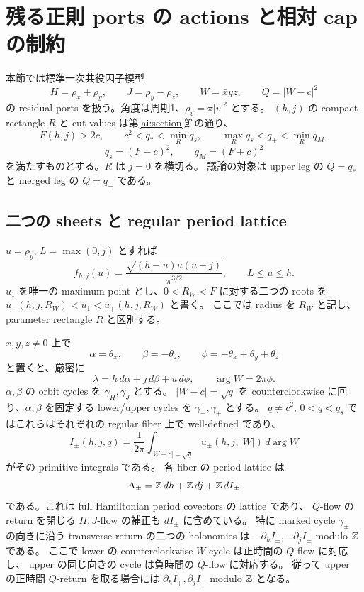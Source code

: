\section{残る正則 ports の actions と相対 cap の制約}
\label{pa:section}

本節では標準一次共役因子模型
\[
 H=\rho_x+\rho_y,\qquad J=\rho_y-\rho_z,
 \qquad W=\bar x yz,\qquad Q=|W-c|^2
\]
の residual ports を扱う。角度は周期1、$\rho_v=\pi|v|^2$ とする。
$(h,j)$ の compact rectangle $R$ と cut values は第\ref{ai:section}節の通り、
\[
 F(h,j)>2c,\qquad c^2<q_*<\min_R q_s,
 \qquad \max_R q_s<q_+<\min_R q_M,
\]
\[
 q_s=(F-c)^2,\qquad q_M=(F+c)^2
\]
を満たすものとする。$R$ は $j=0$ を横切る。
議論の対象は upper leg の $Q=q_*$ と merged leg の $Q=q_+$ である。

\subsection{二つの sheets と regular period lattice}

$u=\rho_y$, $L=\max(0,j)$ とすれば
\[
 f_{h,j}(u)=\frac{\sqrt{(h-u)u(u-j)}}{\pi^{3/2}},
 \qquad L\le u\le h.
\]
$u_1$ を唯一の maximum point とし、$0<R_W<F$ に対する二つの roots を
$u_-(h,j,R_W)<u_1<u_+(h,j,R_W)$ と書く。
ここでは radius を $R_W$ と記し、parameter rectangle $R$ と区別する。

$x,y,z\ne0$ 上で
\[
 \alpha=\theta_x,\qquad \beta=-\theta_z,\qquad
 \phi=-\theta_x+\theta_y+\theta_z
\]
と置くと、厳密に
\begin{equation}\label{pa:primitive}
 \lambda=h\,d\alpha+j\,d\beta+u\,d\phi,
 \qquad \arg W=2\pi\phi.
\end{equation}
$\alpha,\beta$ の orbit cycles を $\gamma_H,\gamma_J$ とする。
$|W-c|=\sqrt q$ を counterclockwise に回り、$\alpha,\beta$ を固定する
lower/upper cycles を $\gamma_-,\gamma_+$ とする。
$q\ne c^2$, $0<q<q_s$ ではこれらはそれぞれの regular fiber 上で well-defined であり、
\begin{equation}\label{pa:raw-actions}
 I_\pm(h,j,q)=\frac1{2\pi}
 \int_{|W-c|=\sqrt q}u_\pm(h,j,|W|)\,d\arg W
\end{equation}
がその primitive integrals である。
各 fiber の period lattice は
\begin{equation}\label{pa:period-lattice}
 \Lambda_\pm=\mathbb Z\,dh+\mathbb Z\,dj+\mathbb Z\,dI_\pm
\end{equation}
である。これは full Hamiltonian period covectors の lattice であり、
$Q$-flow の return を閉じる $H,J$-flow の補正も $dI_\pm$ に含めている。
特に marked cycle $\gamma_\pm$ の向きに沿う transverse return の二つの holonomies は
$-\partial_h I_\pm,-\partial_j I_\pm$ modulo $\mathbb Z$ である。
ここで lower の counterclockwise $W$-cycle は正時間の $Q$-flow に対応し、
upper の同じ向きの cycle は負時間の $Q$-flow に対応する。
従って upper の正時間 $Q$-return を取る場合には
$\partial_h I_+,\partial_j I_+$ modulo $\mathbb Z$ となる。

